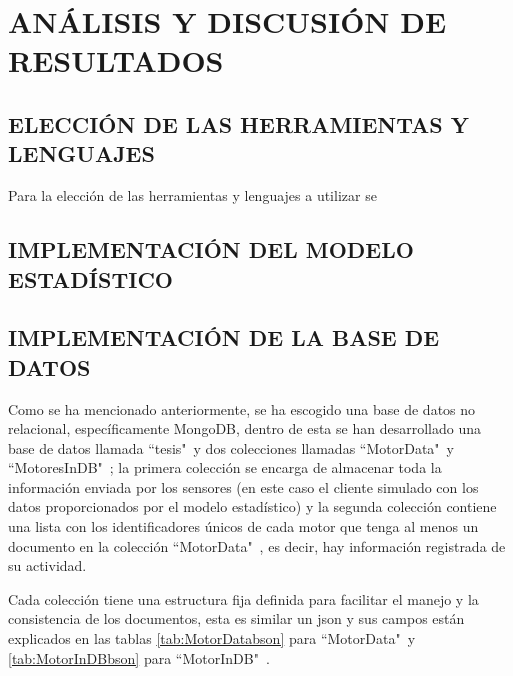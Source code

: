 \thispagestyle{empty}

\section{ANÁLISIS Y DISCUSIÓN DE RESULTADOS}

\subsection{ELECCIÓN DE LAS HERRAMIENTAS Y LENGUAJES}
    Para la elección de las herramientas y lenguajes a utilizar se


\subsection{IMPLEMENTACIÓN DEL MODELO ESTADÍSTICO}


\subsection{IMPLEMENTACIÓN DE LA BASE DE DATOS}

    Como se ha mencionado anteriormente, se ha escogido una base de datos no
    relacional, específicamente MongoDB, dentro de esta se han desarrollado
    una base de datos llamada ``tesis"\   y dos colecciones llamadas ``MotorData"\  y
    ``MotoresInDB"\ ; la primera colección se encarga de almacenar toda la información
    enviada por los sensores (en este caso el cliente simulado con los datos
    proporcionados por el modelo estadístico) y la segunda colección contiene una
    lista con los identificadores únicos de cada motor que tenga al menos un documento
    en la colección ``MotorData"\ , es decir, hay información registrada de su actividad.

    Cada colección tiene una estructura fija definida para facilitar el manejo y
    la consistencia de los documentos, esta es similar un json y sus campos
    están explicados en las tablas \ref{tab:MotorDatabson} para ``MotorData"\  y
    \ref{tab:MotorInDBbson} para ``MotorInDB"\ .


